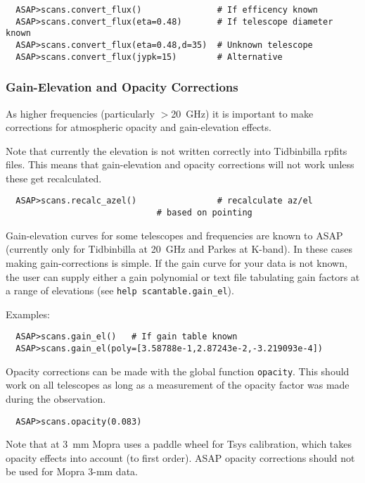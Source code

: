 \documentclass[11pt]{article}
\newcommand{\cmd}[1]{{\tt #1}}
\begin{document}
\begin{verbatim}
  ASAP>scans.convert_flux()               # If efficency known
  ASAP>scans.convert_flux(eta=0.48)       # If telescope diameter known
  ASAP>scans.convert_flux(eta=0.48,d=35)  # Unknown telescope
  ASAP>scans.convert_flux(jypk=15)        # Alternative
\end{verbatim}

\subsubsection{Gain-Elevation and Opacity Corrections}
\label{sec:gainel}

As higher frequencies (particularly $>$20~GHz)
it is important to make corrections for atmospheric opacity and
gain-elevation effects.

Note that currently the elevation is not written correctly into
Tidbinbilla rpfits files. This means that gain-elevation and opacity
corrections will not work unless these get recalculated.

\begin{verbatim}
  ASAP>scans.recalc_azel()                # recalculate az/el 
              				  # based on pointing
\end{verbatim}

Gain-elevation curves for some telescopes and frequencies are known to
ASAP (currently only for Tidbinbilla at 20~GHz and Parkes at K-band). 
In these cases making gain-corrections is simple.  If the gain curve for your
data is not known, the user can supply either a gain polynomial or text file
tabulating gain factors at a range of elevations (see \cmd{help
scantable.gain\_el}).

Examples:

\begin{verbatim}
  ASAP>scans.gain_el()   # If gain table known
  ASAP>scans.gain_el(poly=[3.58788e-1,2.87243e-2,-3.219093e-4])
\end{verbatim}

Opacity corrections can be made with the global
function \cmd{opacity}. This should work on all telescopes as long as
a measurement of the opacity factor was made during the observation.

\begin{verbatim}
  ASAP>scans.opacity(0.083)
\end{verbatim}

Note that at 3~mm Mopra uses a paddle wheel for Tsys calibration,
which takes opacity effects into account (to first order). ASAP
opacity corrections should not be used for Mopra 3-mm data.
\end{document}
